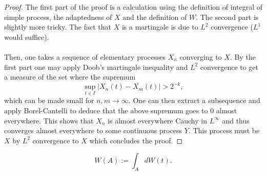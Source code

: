 \documentclass[
    a4paper,
    DIV=14,
    abstract=true,
    numbers=noenddot
]{scrartcl}
\begin{document}
\begin{proof}
	The first part of the proof is a calculation using the definition of integral of simple process, the adaptedness of $X$ and the definition of  $W$. The second part is slightly more tricky. The fact that $X$ is a martingale is due to  $L^2$ convergence ($L^1$ would suffice).\\\\ Then, one takes a sequence of elementary processes  $X_n$ converging to  $X$. By the first part one may apply Doob's martingale inequality and $L^2$ convergence to get a measure of the set where the supremum
	\begin{equation*}
		\sup_{t\in I}  |X_n(t)-X_m(t)|>2^{-k},
	\end{equation*}
	which can be made small for $n,m \to\infty$. One can then extract a subsequence and apply Borel-Cantelli to deduce that the above supremum goes to $0$ almost everywhere. This shows that  $X_n$ is almost everywhere Cauchy in  $L^\infty$ and thus converges almost everywhere to some continuous process $Y$. This process must be $X$ by  $L^2$ convergence to  $X$ which concludes the proof.

\end{proof}



\begin{equation*}
	W(A):=\int_{A} dW(t).
\end{equation*}
\end{document}
